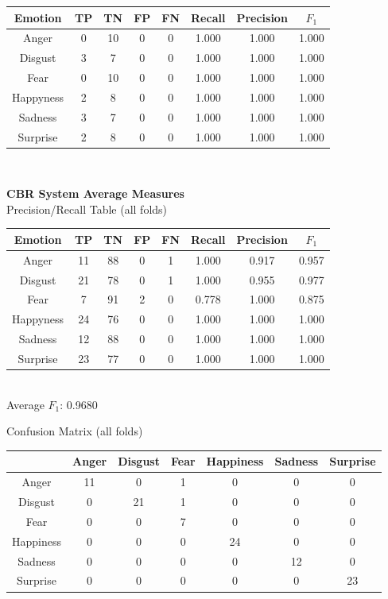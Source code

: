 \documentclass[a4paper]{article}
\begin{document}
\begin{center}
  \begin{tabular}{c|cccc|ccc}
	\hline
    Emotion & TP & TN & FP & FN & Recall & Precision & $F_1$ \\
    \hline
    Anger & 0 & 10 & 0 & 0	 & 1.000 & 1.000 & 1.000\\
Disgust & 3 & 7 & 0 & 0	 & 1.000 & 1.000 & 1.000\\
Fear & 0 & 10 & 0 & 0	 & 1.000 & 1.000 & 1.000\\
Happyness & 2 & 8 & 0 & 0	 & 1.000 & 1.000 & 1.000\\
Sadness & 3 & 7 & 0 & 0	 & 1.000 & 1.000 & 1.000\\
Surprise & 2 & 8 & 0 & 0	 & 1.000 & 1.000 & 1.000\\
\hline
  \end{tabular}\\
  \end{center}
  

{\bf CBR System Average Measures}\\
  
  Precision/Recall Table (all folds)\\
  
  \begin{center}
  \begin{tabular}{c|cccc|ccc}
    Emotion & TP & TN & FP & FN & Recall & Precision & $F_1$ \\
    \hline
    Anger & 11 & 88 & 0 & 1	 & 1.000 & 0.917 & 0.957\\
Disgust & 21 & 78 & 0 & 1	 & 1.000 & 0.955 & 0.977\\
Fear & 7 & 91 & 2 & 0	 & 0.778 & 1.000 & 0.875\\
Happyness & 24 & 76 & 0 & 0	 & 1.000 & 1.000 & 1.000\\
Sadness & 12 & 88 & 0 & 0	 & 1.000 & 1.000 & 1.000\\
Surprise & 23 & 77 & 0 & 0	 & 1.000 & 1.000 & 1.000\\
  \end{tabular}\\
  
 Average $F_1$: 0.9680 \\
 \end{center}
 
 Confusion Matrix (all folds)\\
	\begin{center}
  \begin{tabular}{c|cccccc}
    & Anger & Disgust & Fear & Happiness & Sadness & Surprise \\
    \hline
    Anger & 11 & 0 & 1 & 0 & 0 & 0 \\
  Disgust & 0 & 21 & 1 & 0 & 0 & 0 \\
     Fear & 0 & 0 & 7 & 0 & 0 & 0 \\
Happiness & 0 & 0 & 0 & 24 & 0 & 0 \\
  Sadness & 0 & 0 & 0 & 0 & 12 & 0 \\
 Surprise & 0 & 0 & 0 & 0 & 0 & 23 \\
  \end{tabular}\\
  \end{center}
\end{document}
